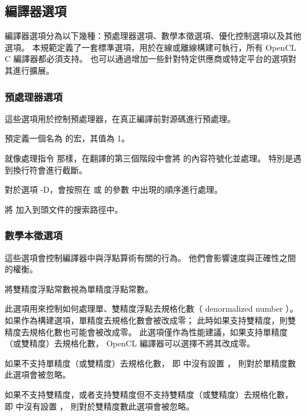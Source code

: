 \subsection{編譯器選項}

編譯器選項分為以下幾種：預處理器選項、數學本徵選項、優化控制選項以及其他選項。
本規範定義了一套標準選項，用於在線或離線構建可執行，所有 OpenCL C 編譯器都必須支持。
也可以通過增加一些針對特定供應商或特定平台的選項對其進行擴展。

\subsubsection{預處理器選項}
這些選項用於控制預處理器，在真正編譯前對源碼進行預處理。

預定義一個名為  的宏，其值為 1。
\stopclOption

就像處理指令  那樣，在翻譯的第三個階段中會將  的內容符號化並處理。
特別是遇到換行符會進行截斷。
\stopclOption

對於選項 -D，會按照在  或  的參數  中出現的順序進行處理。

將  加入到頭文件的搜索路徑中。
\stopclOption

\subsubsection[sec:MathIntrinsicsOption]{數學本徵選項}
這些選項會控制編譯器中與浮點算術有關的行為。
他們會影響速度與正確性之間的權衡。

將雙精度浮點常數視為單精度浮點常數。
\stopclOption

此選項用來控制如何處理單、雙精度浮點去規格化數（ denormalized number ）。
如果作為構建選項，單精度去規格化數會被改成零；
此時如果支持雙精度，則雙精度去規格化數也可能會被改成零。
此選項僅作為性能建議，如果支持單精度（或雙精度）去規格化數，
 OpenCL 編譯器可以選擇不將其改成零。

如果不支持單精度（或雙精度）去規格化數，
即  中沒有設置 ，
則對於單精度數此選項會被忽略。

如果不支持雙精度，或者支持雙精度但不支持雙精度（或雙精度）去規格化數，
即  中沒有設置 ，
則對於雙精度數此選項會被忽略。

